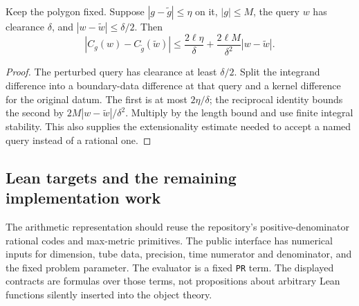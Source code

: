 \begin{proposition}
\label{prop:analytic-cauchy-stability}
Keep the polygon fixed.  Suppose $|g-\widetilde g|\le\eta$ on it, $|g|\le M$, the query $w$ has clearance $\delta$, and $|w-\widetilde w|\le\delta/2$.  Then
\[
 |C_g(w)-C_{\widetilde g}(\widetilde w)|
 \le \frac{2\ell\eta}{\delta}+
       \frac{2\ell M}{\delta^2}|w-\widetilde w|.
\]
\end{proposition}

\begin{proof}
The perturbed query has clearance at least $\delta/2$.  Split the integrand difference into a boundary-data difference at that query and a kernel difference for the original datum.  The first is at most $2\eta/\delta$; the reciprocal identity bounds the second by $2M|w-\widetilde w|/\delta^2$.  Multiply by the length bound and use finite integral stability.  This also supplies the extensionality estimate needed to accept a named query instead of a rational one.
\end{proof}

\subsection{Lean targets and the remaining implementation work}

The arithmetic representation should reuse the repository's positive-denominator rational codes and max-metric primitives.  The public interface has numerical inputs for dimension, tube data, precision, time numerator and denominator, and the fixed problem parameter.  The evaluator is a fixed \texttt{PR} term.  The displayed contracts are formulas over those terms, not propositions about arbitrary Lean functions silently inserted into the object theory.

